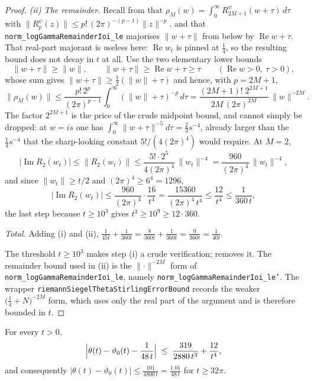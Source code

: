 \begin{proof}
\emph{(ii) The remainder.}  Recall from  that
$\rho_{M}(w)=\int_{0}^{\infty}R^{\psi}_{2M+1}(w+\tau)\,d\tau$ with
$\lVert R^{\psi}_{p}(z)\rVert\le p!\,(2\pi)^{-(p-1)}\lVert z\rVert^{-p}$, and that
\texttt{norm\_logGammaRemainderIoi\_le} majorises $\lVert w+\tau\rVert$ from below by
$\operatorname{Re}w+\tau$.  That real-part majorant is useless here: $\operatorname{Re}w_{t}$
is pinned at $\tfrac14$, so the resulting bound does not decay in $t$ at all.  Use the
two elementary lower bounds
\[
  \lVert w+\tau\rVert\ge\lVert w\rVert,\qquad
  \lVert w+\tau\rVert\ge\operatorname{Re}w+\tau\ge\tau
  \qquad(\operatorname{Re}w>0,\ \tau>0),
\]
whose sum gives $\lVert w+\tau\rVert\ge\tfrac12(\lVert w\rVert+\tau)$ and hence, with
$p=2M+1$,
\[
  \lVert\rho_{M}(w)\rVert\le\frac{p!\,2^{p}}{(2\pi)^{p-1}}
    \int_{0}^{\infty}(\lVert w\rVert+\tau)^{-p}\,d\tau
  =\frac{(2M+1)!\;2^{2M+1}}{2M\,(2\pi)^{2M}}\,\lVert w\rVert^{-2M}.
\]
The factor $2^{2M+1}$ is the price of the crude midpoint bound, and cannot simply be dropped:
at $w=is$ one has $\int_{0}^{\infty}\lVert w+\tau\rVert^{-5}d\tau=\tfrac23 s^{-4}$, already
larger than the $\tfrac14 s^{-4}$ that the sharp-looking constant $5!/(4(2\pi)^{4})$ would
require.  At $M=2$,
\[
  \bigl\lvert\operatorname{Im}R_{2}(w_{t})\bigr\rvert\le\lVert R_{2}(w_{t})\rVert
   \le\frac{5!\cdot2^{5}}{4(2\pi)^{4}}\,\lVert w_{t}\rVert^{-4}
   =\frac{960}{(2\pi)^{4}}\,\lVert w_{t}\rVert^{-4},
\]
and since $\lVert w_{t}\rVert\ge t/2$ and $(2\pi)^{4}\ge6^{4}=1296$,
\[
  \bigl\lvert\operatorname{Im}R_{2}(w_{t})\bigr\rvert
  \le\frac{960}{(2\pi)^{4}}\cdot\frac{16}{t^{4}}
  =\frac{15360}{(2\pi)^{4}\,t^{4}}\le\frac{12}{t^{4}}\le\frac{1}{360\,t},
\]
the last step because $t\ge10^{3}$ gives $t^{3}\ge10^{9}\ge12\cdot360$.

\emph{Total.}  Adding (i) and (ii),
$\tfrac1{45t}+\tfrac1{360t}=\tfrac{8}{360t}+\tfrac1{360t}=\tfrac{9}{360t}=\tfrac1{40t}$.

The threshold $t\ge10^{3}$ makes step (i) a crude verification;
 removes it.  The remainder bound used in (ii) is the
$\lVert\cdot\rVert^{-2M}$ form of
\texttt{norm\_logGammaRemainderIoi\_le}, namely
\texttt{norm\_logGammaRemainderIoi\_le'}.  The wrapper
\texttt{riemannSiegelThetaStirlingErrorBound} records the weaker
$\bigl(\tfrac14+N\bigr)^{-2M}$ form, which uses only the real part of the argument and is
therefore bounded in $t$.
\end{proof}

\begin{lemma}
\label{lem:rsf_theta_sharp}
\leanok
{}
For every $t>0$,
\[
  \Bigl\lvert\theta(t)-\vartheta_{0}(t)-\frac1{48\,t}\Bigr\rvert
  \;\le\;\frac{319}{2880\,t^{3}}+\frac{12}{t^{4}} ,
\]
and consequently $\lvert\theta(t)-\vartheta_{0}(t)\rvert\le\tfrac{101}{4800\,t}
=\tfrac{1.01}{48\,t}$ for $t\ge32\pi$.
\end{lemma}

